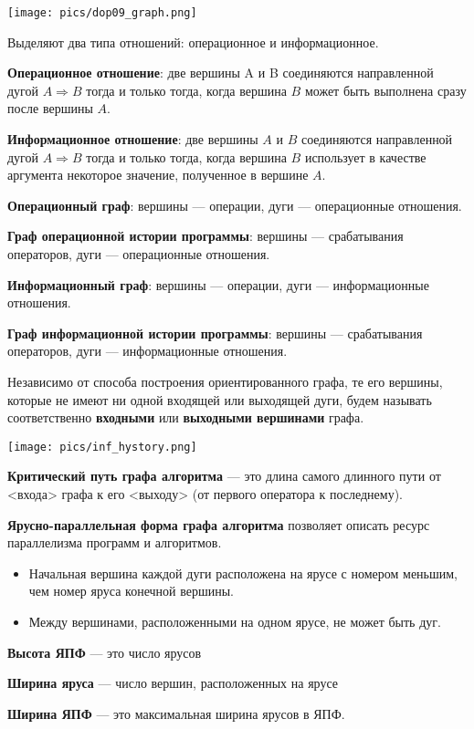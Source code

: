 \texttt{[image: pics/dop09\_graph.png]}

Выделяют два типа отношений: операционное и информационное.

\textbf{Операционное отношение}: две вершины A и B соединяются направленной дугой $A \Rightarrow B$ тогда и только тогда, когда вершина $B$ может быть выполнена сразу после вершины $A$.

\textbf{Информационное отношение}: две вершины $A$ и $B$ соединяются направленной дугой $A \Rightarrow B$ тогда и только тогда, когда вершина $B$ использует в качестве аргумента некоторое значение, полученное в вершине $A$.

\bigbreak
\textbf{Операционный граф}: вершины --- операции, дуги --- операционные отношения.

\textbf{Граф операционной истории программы}: вершины --- срабатывания операторов, дуги --- операционные отношения.

\textbf{Информационный граф}: вершины --- операции, дуги --- информационные отношения.

\textbf{Граф информационной истории программы}: вершины --- срабатывания операторов, дуги --- информационные отношения.

Независимо от способа построения ориентированного графа, те его вершины, которые не имеют ни одной входящей или выходящей дуги, будем называть соответственно \textbf{входными} или \textbf{выходными вершинами} графа.


\texttt{[image: pics/inf\_hystory.png]}

\textbf{Критический путь графа алгоритма} --- это длина самого длинного пути от <входа> графа к его <выходу> (от первого оператора к последнему).

\textbf{Ярусно-параллельная форма графа алгоритма} позволяет описать ресурс параллелизма программ и алгоритмов.
\begin{itemize}
    \item Начальная вершина каждой дуги расположена на ярусе с номером меньшим, чем номер яруса конечной вершины.
    \item Между вершинами, расположенными на одном ярусе, не может быть дуг.
\end{itemize}

\textbf{Высота ЯПФ} --- это число ярусов

\textbf{Ширина яруса} --- число вершин, расположенных на ярусе

\textbf{Ширина ЯПФ} --- это максимальная ширина ярусов в ЯПФ.

